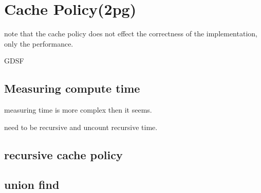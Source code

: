 \section{Cache Policy(2pg)}
note that the cache policy does not effect the correctness of the implementation, only the performance.

GDSF
\subsection{Measuring compute time}
measuring time is more complex then it seems.

need to be recursive and uncount recursive time.
\subsection{recursive cache policy}
\subsection{union find}